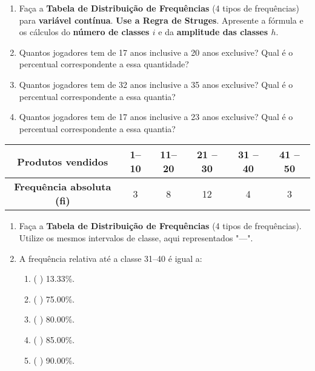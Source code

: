 \documentclass{jhwhw}
\begin{document}
\begin{enumerate}[label=\alph*)]
    \item Faça a \textbf{Tabela de Distribuição de Frequências} (4 tipos de frequências) para \textbf{variável contínua}. \textbf{Use a Regra de Struges}. Apresente a fórmula e os cálculos do \textbf{número de classes $i$} e da \textbf{amplitude das classes $h$}.
    \item Quantos jogadores tem de 17 anos inclusive a 20 anos exclusive? Qual é o percentual correspondente a essa quantidade?
    \item Quantos jogadores tem de 32 anos inclusive a 35 anos exclusive? Qual é o percentual correspondente a essa quantia?
    \item Quantos jogadores tem de 17 anos inclusive a 23 anos exclusive? Qual é o percentual correspondente a essa quantia?
\end{enumerate}

\newpage

\begin{table}
    \begin{center}
        \begin{tabular}{| c | c | c | c | c | c |}
            \hline
            \textbf{Produtos vendidos} & 1--10 & 11--20 & 21 -- 30 & 31 -- 40 & 41 -- 50 \\
            \hline
            \textbf{Frequência absoluta (fi)} & 3 & 8 & 12 & 4 & 3 \\
            \hline
        \end{tabular}
    \end{center}
\end{table}

\begin{enumerate}[label=\alph*)]
    \item Faça a \textbf{Tabela de Distribuição de Frequências} (4 tipos de frequências). Utilize os mesmos intervalos de classe, aqui representados "---".
    \item A frequência relativa até a classe 31--40 é igual a:
        \begin{enumerate}[label=\textbf{\Alph*)}]
            \item ( ) 13.33\%.
            \item ( ) 75.00\%.
            \item ( ) 80.00\%.
            \item ( ) 85.00\%.
            \item ( ) 90.00\%.
        \end{enumerate}
\end{enumerate}
\end{document}
